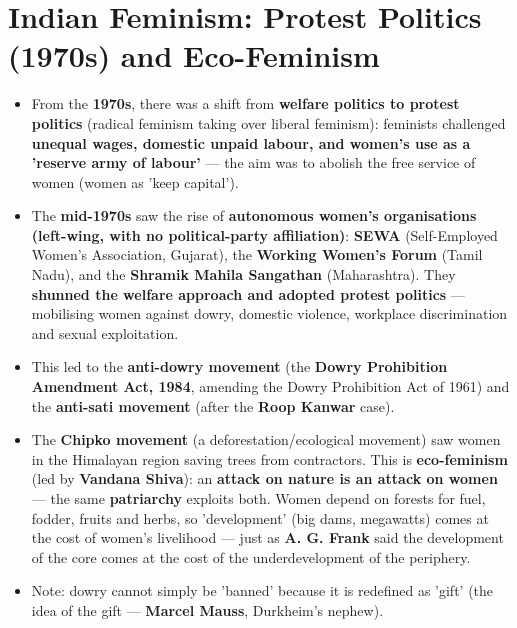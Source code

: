 \section{Indian Feminism: Protest Politics (1970s) and Eco-Feminism}

\begin{KeyConcept}
\begin{itemize}
\item From the \textbf{1970s}, there was a shift from \textbf{welfare politics to protest politics} (radical feminism taking over liberal feminism): feminists challenged \textbf{unequal wages, domestic unpaid labour, and women's use as a 'reserve army of labour'} --- the aim was to abolish the free service of women (women as 'keep capital').
\item The \textbf{mid-1970s} saw the rise of \textbf{autonomous women's organisations (left-wing, with no political-party affiliation)}: \textbf{SEWA} (Self-Employed Women's Association, Gujarat), the \textbf{Working Women's Forum} (Tamil Nadu), and the \textbf{Shramik Mahila Sangathan} (Maharashtra). They \textbf{shunned the welfare approach and adopted protest politics} --- mobilising women against dowry, domestic violence, workplace discrimination and sexual exploitation.
\item This led to the \textbf{anti-dowry movement} (the \textbf{Dowry Prohibition Amendment Act, 1984}, amending the Dowry Prohibition Act of 1961) and the \textbf{anti-sati movement} (after the \textbf{Roop Kanwar} case).
\end{itemize}
\end{KeyConcept}

\begin{KeyConcept}
\begin{itemize}
\item The \textbf{Chipko movement} (a deforestation/ecological movement) saw women in the Himalayan region saving trees from contractors. This is \textbf{eco-feminism} (led by \textbf{Vandana Shiva}): an \textbf{attack on nature is an attack on women} --- the same \textbf{patriarchy} exploits both. Women depend on forests for fuel, fodder, fruits and herbs, so 'development' (big dams, megawatts) comes at the cost of women's livelihood --- just as \textbf{A. G. Frank} said the development of the core comes at the cost of the underdevelopment of the periphery.
\item Note: dowry cannot simply be 'banned' because it is redefined as 'gift' (the idea of the gift --- \textbf{Marcel Mauss}, Durkheim's nephew).
\end{itemize}
\end{KeyConcept}

